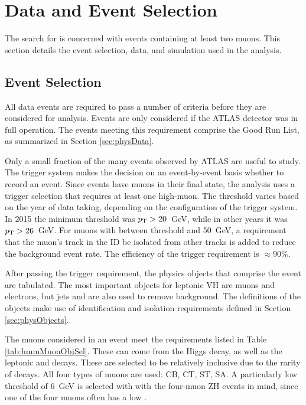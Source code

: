 \section{Data and Event Selection}\label{sec:hmmEvSel}

The search for \hmm is concerned with events containing at least two muons.
This section details the event selection, data, and simulation used in the analysis.

\subsection{Event Selection}\label{sec:hmmEv}

All data events are required to pass a number of criteria before they are considered for analysis.
Events are only considered if the ATLAS detector was in full operation.
The events meeting this requirement comprise the Good Run List, as summarized in Section \ref{sec:physData}.

Only a small fraction of the many events observed by ATLAS are useful to study. 
The trigger system makes the decision on an event-by-event basis whether to record an event. 
Since \hmm events have muons in their final state, the analysis uses a trigger selection that requires at least one high-\pt muon.
The \pt threshold varies based on the year of data taking, depending on the configuration of the trigger system.
In 2015 the minimum threshold was $p_\text{T}>20$~GeV, while in other years it was $p_\text{T}>26$~GeV.
For muons with \pt between threshold and 50~GeV, a requirement that the muon's track in the ID be isolated from other tracks is added to reduce the background event rate.
The efficiency of the trigger requirement is $\approx90\%$.

After passing the trigger requirement, the physics objects that comprise the event are tabulated.
The most important objects for leptonic VH \hmm are muons and electrons, but jets and \met are also used to remove background.
The definitions of the objects make use of identification and isolation requirements defined in Section \ref{sec:physObjects}.

The muons considered in an event meet the requirements listed in Table \ref{tab:hmmMuonObjSel}.
These can come from the Higgs decay, as well as the leptonic \W and \Z decays.
These are selected to be relatively inclusive due to the rarity of \hmm decays.
All four types of muons are used: CB, CT, ST, SA.
A particularly low \pt threshold of 6~GeV is selected with with the four-muon ZH events in mind, since one of the four muons often has a low \pt.

